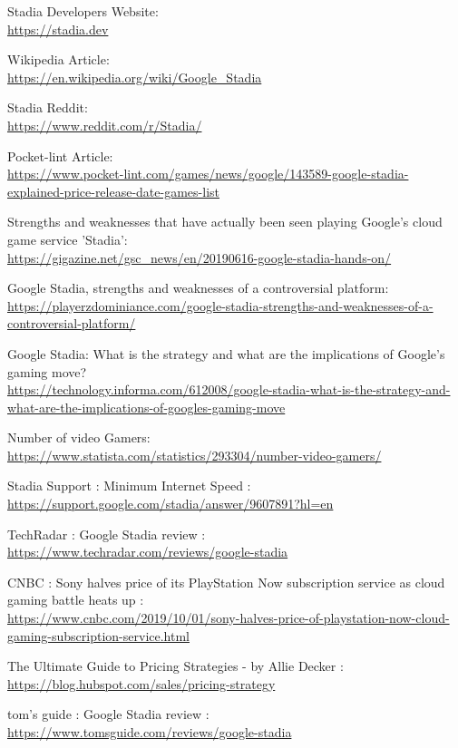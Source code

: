 \documentclass[a4paper,12pt]{article}
\newcommand{\link}[1]{{\color{blue}\href{#1}{#1}}}
\begin{document}
\newpage
{}
\begin{thebibliography}{9}

Stadia Developers Website: \\ \link{https://stadia.dev}

Wikipedia Article: \\ \link{https://en.wikipedia.org/wiki/Google\_Stadia}

Stadia Reddit: \\ \link{https://www.reddit.com/r/Stadia/}

Pocket-lint Article: \\ \link{https://www.pocket-lint.com/games/news/google/143589-google-stadia-explained-price-release-date-games-list}

Strengths and weaknesses that have actually been seen playing Google's cloud game service 'Stadia': 
\\ \link{https://gigazine.net/gsc\_news/en/20190616-google-stadia-hands-on/}

Google Stadia, strengths and weaknesses of a controversial platform: 
\\ \link{https://playerzdominiance.com/google-stadia-strengths-and-weaknesses-of-a-controversial-platform/}

Google Stadia: What is the strategy and what are the implications of Google's gaming move?
\\ \link{https://technology.informa.com/612008/google-stadia-what-is-the-strategy-and-what-are-the-implications-of-googles-gaming-move}

Number of video Gamers:
\\ \link{https://www.statista.com/statistics/293304/number-video-gamers/}

Stadia Support : Minimum Internet Speed : \\ \link{https://support.google.com/stadia/answer/9607891?hl=en}

TechRadar : Google Stadia review : \\ \link{https://www.techradar.com/reviews/google-stadia}

CNBC : Sony halves price of its PlayStation Now subscription service as cloud gaming battle heats up : \\ \link{https://www.cnbc.com/2019/10/01/sony-halves-price-of-playstation-now-cloud-gaming-subscription-service.html}

The Ultimate Guide to Pricing Strategies - by Allie Decker : \\ \link{https://blog.hubspot.com/sales/pricing-strategy}

tom's guide : Google Stadia review : \\ \link{https://www.tomsguide.com/reviews/google-stadia}


\end{thebibliography}
\end{document}
